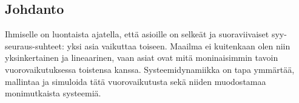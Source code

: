 \documentclass[finnish,12pt,a4paper,pdftex]{article}
\begin{document}
\begin{onehalfspacing} %




\cleardoublepage
\storeinipagenumber
{}
\setcounter{page}{1}



\section{Johdanto}

\thispagestyle{empty}

Ihmiselle on luontaista ajatella, että asioille on selkeät ja suoraviivaiset syy-seuraus-suhteet: yksi asia vaikuttaa toiseen. Maailma ei kuitenkaan olen niin yksinkertainen ja lineaarinen, vaan asiat ovat mitä moninaisimmin tavoin vuorovaikutuksessa toistensa kanssa. Systeemidynamiikka on tapa ymmärtää, mallintaa ja simuloida tätä vuorovaikutusta sekä niiden muodostamaa monimutkaista systeemiä. 


\end{onehalfspacing}
\end{document}
